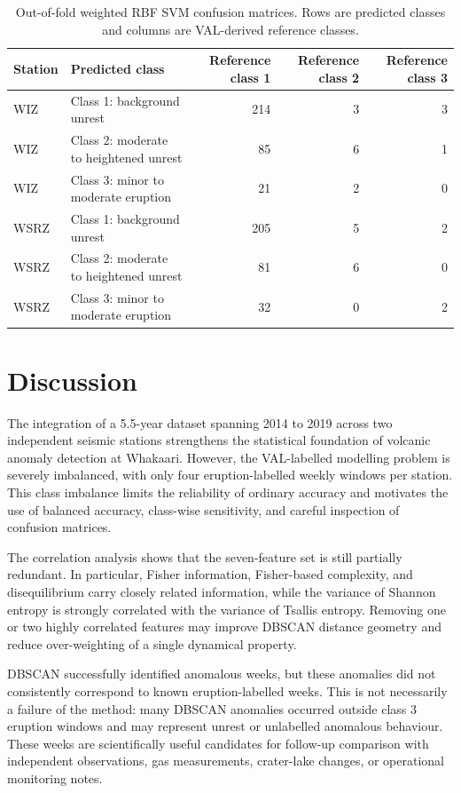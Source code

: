 \documentclass[journal]{IEEEtran}
\begin{document}
\begin{table}[!t]
\centering
\caption{Out-of-fold weighted RBF SVM confusion matrices. Rows are predicted classes and columns are VAL-derived reference classes.}
\label{tab:svm_confusion}
\begin{tabular}{llrrr}
\toprule
Station & Predicted class & Reference class 1 & Reference class 2 & Reference class 3 \\
\midrule
WIZ  & Class 1: background unrest & 214 & 3 & 3 \\
WIZ  & Class 2: moderate to heightened unrest & 85 & 6 & 1 \\
WIZ  & Class 3: minor to moderate eruption & 21 & 2 & 0 \\
\midrule
WSRZ & Class 1: background unrest & 205 & 5 & 2 \\
WSRZ & Class 2: moderate to heightened unrest & 81 & 6 & 0 \\
WSRZ & Class 3: minor to moderate eruption & 32 & 0 & 2 \\
\bottomrule
\end{tabular}
\end{table}

\section{Discussion}
The integration of a 5.5-year dataset spanning 2014 to 2019 across two independent seismic stations strengthens the statistical foundation of volcanic anomaly detection at Whakaari. However, the VAL-labelled modelling problem is severely imbalanced, with only four eruption-labelled weekly windows per station. This class imbalance limits the reliability of ordinary accuracy and motivates the use of balanced accuracy, class-wise sensitivity, and careful inspection of confusion matrices.

The correlation analysis shows that the seven-feature set is still partially redundant. In particular, Fisher information, Fisher-based complexity, and disequilibrium carry closely related information, while the variance of Shannon entropy is strongly correlated with the variance of Tsallis entropy. Removing one or two highly correlated features may improve DBSCAN distance geometry and reduce over-weighting of a single dynamical property.

DBSCAN successfully identified anomalous weeks, but these anomalies did not consistently correspond to known eruption-labelled weeks. This is not necessarily a failure of the method: many DBSCAN anomalies occurred outside class 3 eruption windows and may represent unrest or unlabelled anomalous behaviour. These weeks are scientifically useful candidates for follow-up comparison with independent observations, gas measurements, crater-lake changes, or operational monitoring notes.
\end{document}
